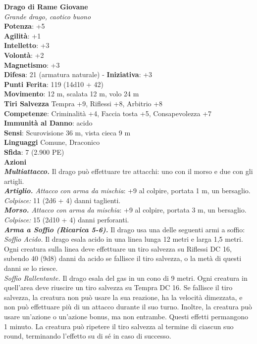 \begin{multicols}{2}
\medskip\textbf{Drago di Rame Giovane}\\
\emph{Grande drago, caotico buono}\\
\textbf{Potenza}: +5\\
\textbf{Agilità}: +1\\
\textbf{Intelletto}: +3\\
\textbf{Volontà}: +2\\
\textbf{Magnetismo}: +3\\
\textbf{Difesa}: 21 (armatura naturale) - \textbf{Iniziativa}: +3\\
\textbf{Punti Ferita}: 119 (14d10 + 42)\\
\textbf{Movimento}: 12 m, scalata 12 m, volo 24 m\\
\textbf{Tiri Salvezza} Tempra +9, Riflessi +8, Arbitrio +8\\
\textbf{Competenze}: Criminalità +4, Faccia tosta +5, Consapevolezza +7\\
\textbf{Immunità al Danno}: acido\\
\textbf{Sensi}: Scurovisione 36 m, vista cieca 9 m\\
\textbf{Linguaggi} Comune, Draconico\\
\textbf{Sfida}: 7 (2.900 PE)\smallskip\\
\smallskip\textbf{Azioni}\\
\emph{\textbf{Multiattacco.}} Il drago può effettuare tre attacchi: uno con il morso e due con gli artigli.\\
\emph{\textbf{Artiglio.} Attacco con arma da mischia}: +9 al colpire, portata 1 m, un bersaglio.\\
\emph{Colpisce:} 11 (2d6 + 4) danni taglienti.\\
\emph{\textbf{Morso.} Attacco con arma da mischia}: +9 al colpire, portata 3 m, un bersaglio.\\
\emph{Colpisce:} 15 (2d10 + 4) danni perforanti.\\
\emph{\textbf{Arma a Soffio (Ricarica 5-6).}} Il drago usa una delle seguenti armi a soffio:\\
\emph{Soffio Acido.} Il drago esala acido in una linea lunga 12 metri e larga 1,5 metri. Ogni creatura sulla linea deve effettuare un tiro salvezza su Riflessi DC  16, subendo 40 (9d8) danni da acido se fallisce il tiro salvezza, o la metà di questi danni se lo riesce.\\
\emph{Soffio Rallentante.} Il drago esala del gas in un cono di 9 metri. Ogni creatura in quell'area deve riuscire un tiro salvezza su Tempra DC  16. Se fallisce il tiro salvezza, la creatura non può usare la sua reazione, ha la velocità dimezzata, e non può effettuare più di un attacco durante il suo turno. Inoltre, la creatura può usare un'azione o un'azione bonus, ma non entrambe. Questi effetti permangono 1 minuto. La creatura può ripetere il tiro salvezza al termine di ciascun suo round, terminando l'effetto su di sé in caso di successo.\\

\end{multicols}

